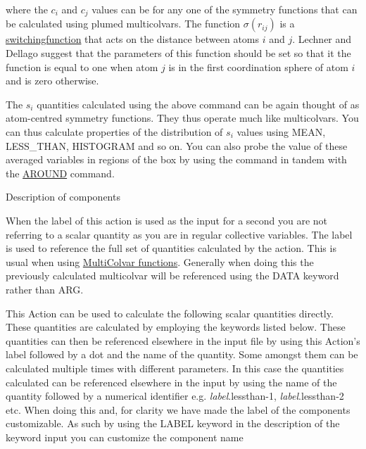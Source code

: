 where the $c_i$ and $c_j$ values can be for any one of the symmetry functions that can be calculated using plumed multicolvars. The function $\sigma( r_{ij} )$ is a \hyperlink{switchingfunction}{switchingfunction} that acts on the distance between atoms $i$ and $j$. Lechner and Dellago suggest that the parameters of this function should be set so that it the function is equal to one when atom $j$ is in the first coordination sphere of atom $i$ and is zero otherwise.

The $s_i$ quantities calculated using the above command can be again thought of as atom-\/centred symmetry functions. They thus operate much like multicolvars. You can thus calculate properties of the distribution of $s_i$ values using M\+E\+A\+N, L\+E\+S\+S\+\_\+\+T\+H\+A\+N, H\+I\+S\+T\+O\+G\+R\+A\+M and so on. You can also probe the value of these averaged variables in regions of the box by using the command in tandem with the \hyperlink{AROUND}{A\+R\+O\+U\+N\+D} command.

\begin{DoxyParagraph}{Description of components}

\end{DoxyParagraph}
When the label of this action is used as the input for a second you are not referring to a scalar quantity as you are in regular collective variables. The label is used to reference the full set of quantities calculated by the action. This is usual when using \hyperlink{mcolv_multicolvarfunction}{Multi\+Colvar functions}. Generally when doing this the previously calculated multicolvar will be referenced using the D\+A\+T\+A keyword rather than A\+R\+G.

This Action can be used to calculate the following scalar quantities directly. These quantities are calculated by employing the keywords listed below. These quantities can then be referenced elsewhere in the input file by using this Action's label followed by a dot and the name of the quantity. Some amongst them can be calculated multiple times with different parameters. In this case the quantities calculated can be referenced elsewhere in the input by using the name of the quantity followed by a numerical identifier e.\+g. {\itshape label}.lessthan-\/1, {\itshape label}.lessthan-\/2 etc. When doing this and, for clarity we have made the label of the components customizable. As such by using the L\+A\+B\+E\+L keyword in the description of the keyword input you can customize the component name

